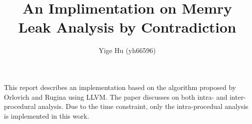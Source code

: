 \documentclass[12pt]{article}
\title{\bf \Large An Implimentation on Memry Leak Analysis by Contradiction}
\author{\normalsize Yige Hu (yh66596)}
\date{}
\newcommand{\llvm}[0]{LLVM\xspace}
\begin{document}
\maketitle


This report describes an implementation based on the algorithm proposed by
Orlovich and Rugina\cite{rugina} using \llvm. The paper discusses on both 
intra- and inter- procedural analysis. Due to the time constraint, only the
intra-procedual analysis is implemented in this work.

%

%



%
%
%


\footnotesize


\end{document}

